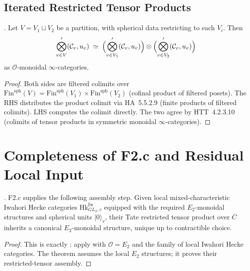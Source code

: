 \subsection{Iterated Restricted Tensor Products}

\begin{proposition}
\label{v4-arith:tate:prop:iterated-restricted}
\ClaimStatusProvedHere. Let \(V=V_{1}\sqcup V_{2}\) be a partition,
with spherical data restricting to each \(V_{i}\). Then
\[
\bigotimes_{v\in V}^{\prime}(\mathcal{C}_{v},u_{v})\;\simeq\;\Bigl(\bigotimes_{v\in V_{1}}^{\prime}(\mathcal{C}_{v},u_{v})\Bigr)\otimes\Bigl(\bigotimes_{v\in V_{2}}^{\prime}(\mathcal{C}_{v},u_{v})\Bigr)
\]
as \(\mathcal{O}\)-monoidal \(\infty\)-categories.
\end{proposition}

\begin{proof}
Both sides are filtered colimits over
\(\mathrm{Fin}^{\mathrm{sph}}(V)=\mathrm{Fin}^{\mathrm{sph}}(V_{1})\times\mathrm{Fin}^{\mathrm{sph}}(V_{2})\)
(cofinal product of filtered posets). The RHS distributes the
product colimit via HA~5.5.2.9 (finite products of filtered
colimits). LHS computes the colimit directly. The two agree by
HTT~4.2.3.10 (colimits of tensor products in symmetric monoidal
\(\infty\)-categories).
\end{proof}

\section{Completeness of F2.c and Residual Local Input}
\label{v4-arith:tate:completeness-F2}

\begin{theorem}
\label{v4-arith:tate:thm:F2-closure}
\ClaimStatusProvedHere. F2.c supplies the following assembly step.
Given local
mixed-characteristic Iwahori Hecke categories
\(\mathrm{Hk}^{\mathrm{Iw}}_{GL_{2},v}\) equipped with
the required \(E_{2}\)-monoidal structures and spherical units
\(|0\rangle_{v}\), their Tate restricted tensor product over
\(\overline{C}\) inherits a canonical \(E_{2}\)-monoidal structure,
unique up to contractible choice.
\end{theorem}

\begin{proof}
This is exactly : apply
 with \(\mathcal{O}=E_{2}\) and
the family of local Iwahori Hecke categories. The theorem assumes
the local \(E_{2}\) structures; it proves their restricted-tensor
assembly.
\end{proof}

